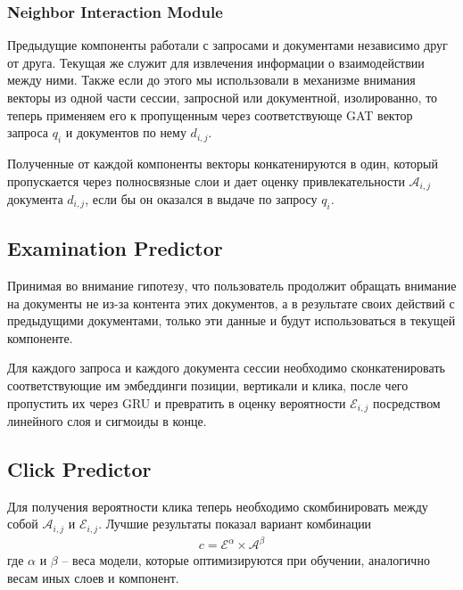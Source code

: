 \documentclass[diploma]{nanolab2015}
\begin{document}
\subsubsection{Neighbor Interaction Module}
Предыдущие компоненты работали с запросами и документами независимо друг от друга. Текущая же служит для извлечения информации о взаимодействии между ними. Также если до этого мы использовали в механизме внимания векторы из одной части сессии, запросной или документной, изолированно, то теперь применяем его к пропущенным через соответствующе GAT вектор запроса $q_i$ и документов по нему $d_{i,j}$.

Полученные от каждой компоненты векторы конкатенируются в один, который пропускается через полносвязные слои и дает оценку привлекательности $\mathcal{A}_{i,j}$ документа $d_{i,j}$, если бы он оказался в выдаче по запросу ${q_i}$.

\subsection{Examination Predictor}
Принимая во внимание гипотезу, что пользователь продолжит обращать внимание на документы не из-за контента этих документов, а в результате своих действий с предыдущими документами, только эти данные и будут использоваться в текущей компоненте.

Для каждого запроса и каждого документа сессии необходимо сконкатенировать соответствующие им эмбеддинги позиции, вертикали и клика, после чего пропустить их через GRU и превратить в оценку вероятности $\mathcal{E}_{i,j}$ посредством линейного слоя и сигмоиды в конце.

\subsection{Click Predictor}
Для получения вероятности клика теперь необходимо скомбинировать между собой $\mathcal{A}_{i,j}$ и $\mathcal{E}_{i,j}$. Лучшие результаты показал вариант комбинации
\begin{align}
    c = \mathcal{E}^\alpha \times \mathcal{A}^\beta
\end{align}
где $\alpha$ и $\beta$ -- веса модели, которые оптимизируются при обучении, аналогично весам иных слоев и компонент.
\end{document}
